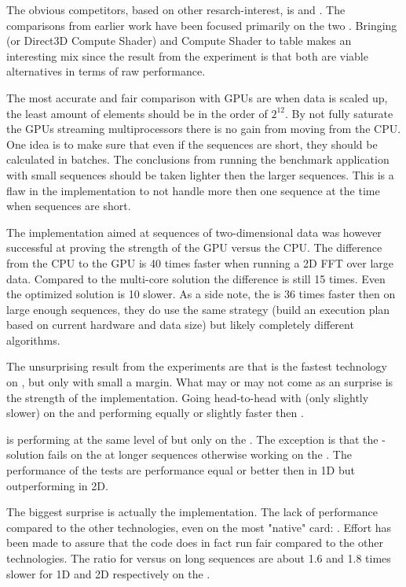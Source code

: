 The obvious competitors, based on other resarch-interest, is {\CU} and {\OCL}. The comparisons from earlier work have been focused primarily on the two \cite{Fang2011b}\cite{Karimi2010}\cite{Park2011}\cite{Su2012b}. Bringing {\DX} (or Direct3D Compute Shader) and {\GL} Compute Shader to table makes an interesting mix since the result from the experiment is that both are viable alternatives in terms of raw performance.

The most accurate and fair comparison with GPUs are when data is scaled up, the least amount of elements should be in the order of $2^{12}$. By not fully saturate the GPUs streaming multiprocessors there is no gain from moving from the CPU. One idea is to make sure that even if the sequences are short, they should be calculated in batches. The conclusions from running the benchmark application with small sequences should be taken lighter then the larger sequences. This is a flaw in the implementation to not handle more then one sequence at the time when sequences are short.

The implementation aimed at sequences of two-dimensional data was however successful at proving the strength of the GPU versus the CPU. The difference from the CPU to the GPU is 40 times faster when running a 2D FFT over large data. Compared to the multi-core {\OMP} solution the difference is still 15 times. Even the optimized {\FFTW} solution is 10 slower. As a side note, the {\CUFFT} is 36 times faster then {\FFTW} on large enough sequences, they do use the same strategy (build an execution plan based on current hardware and data size) but likely completely different algorithms.

The unsurprising result from the experiments are that {\CU} is the fastest technology on {\NVCARD}, but only with small a margin. What may or may not come as an surprise is the strength of the {\DX} implementation. Going head-to-head with {\CU} (only slightly slower) on the {\NVCARD} and performing equally or slightly faster then {\OCL}.

{\GL} is performing at the same level of {\DX} but only on the {\AMDCARD}. The exception is that the {\GL}-solution fails on the {\AMDCARD} at longer sequences otherwise working on the {\NVCARD}. The performance of the {\GL} tests are performance equal or better then {\OCL} in 1D but outperforming {\OCL} in 2D.

The biggest surprise is actually the {\OCL} implementation. The lack of performance compared to the other technologies, even on the most "native" card: \AMDCARD. Effort has been made to assure that the code does in fact run fair compared to the other technologies. The ratio for {\OCL} versus {\CU} on long sequences are about 1.6 and 1.8 times slower for 1D and 2D respectively on the {\NVCARD}.

